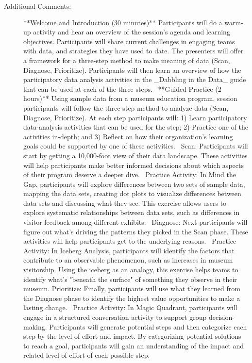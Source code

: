 \documentclass{report}
\begin{document}
\begin{description}
                    \item [Additional Comments: ]**Welcome and Introduction (30 minutes)**
Participants will do a warm-up activity and hear an overview of the session’s agenda and learning objectives. Participants will share current challenges in engaging teams with data, and strategies they have used to date. The presenters will offer a framework for a three-step method to make meaning of data (Scan, Diagnose, Prioritize). Participants will then learn an overview of how the participatory data analysis activities in the \_Dabbling in the Data\_ guide that can be used at each of the three steps. 
**Guided Practice (2 hours)**
Using sample data from a museum education program, session participants will follow the three-step method to analyze data (Scan, Diagnose, Prioritize). At each step participants will: 1) Learn participatory data-analysis activities that can be used for the step; 2) Practice one of the activities in-depth; and 3) Reflect on how their organization’s learning goals could be supported by one of these activities. 
Scan: Participants will start by getting a 10,000-foot view of their data landscape. These activities will help participants make better informed decisions about which aspects of their program deserve a deeper dive. 
Practice Activity: In Mind the Gap, participants will explore differences between two sets of sample data, mapping the data sets, creating dot plots to visualize differences between data sets and discussing what they see. This exercise allows users to explore systematic relationships between data sets, such as differences in visitor feedback among different exhibits. 
Diagnose: Next participants will figure out what’s driving the patterns they picked in the Scan phase. These activities will help participants get to the underlying reasons. 
Practice Activity: In Iceberg Analysis, participants will identify the factors that contribute to an observable phenomenon, such as increases in museum visitorship. Using the iceberg as an analogy, this exercise helps teams to identify what's "beneath the surface" of something they observe in their museum.
Prioritize: Finally, participants will use what they learned from the Diagnose phase to identify the highest value opportunities to make a lasting change. 
Practice Activity: In Magic Quadrant, participants will engage in a structured conversation activity to support group decision-making. Participants will generate potential steps and then categorize each step by the level of effort and impact. By categorizing potential solutions to reach a goal, participants will gain an understanding of the impact and related level of effort of each possible step.

\end{description}
\end{document}

